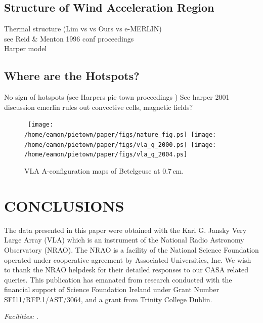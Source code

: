 \documentclass[iop]{emulateapj}
\begin{document}
\subsection{Structure of Wind Acceleration Region} 
Thermal structure (Lim vs vs Ours vs e-MERLIN)\\
see Reid \& Menton 1996 conf proceedings\\
Harper model

\subsection{Where are the Hotspots?}

No sign of hotspots (see Harpers pie town proceedings )
See harper 2001 discussion	
emerlin rules out convective cells, magnetic fields?



\begin{figure*}
\mbox{
\texttt{[image: /home/eamon/pietown/paper/figs/nature\_fig.ps]}
\texttt{[image: /home/eamon/pietown/paper/figs/vla\_q\_2000.ps]}
\texttt{[image: /home/eamon/pietown/paper/figs/vla\_q\_2004.ps]}
}
\caption{VLA A-configuration maps of Betelgeuse at 0.7\,cm. }
\label{fig:fig5}
\end{figure*}




\section{CONCLUSIONS}
 


\acknowledgments
The data presented in this paper were obtained with the Karl G. Jansky Very Large Array (VLA) which is an instrument of the National Radio Astronomy Observatory (NRAO). The NRAO is a facility of the National Science Foundation operated under cooperative agreement by Associated Universities, Inc. We wish to thank the NRAO helpdesk for their detailed responses to our CASA related queries. This publication has emanated from research conducted with the financial support of Science Foundation Ireland under Grant Number SFI11/RFP.1/AST/3064, and a grant from Trinity College Dublin.

{\it Facilities:} .




\end{document}
